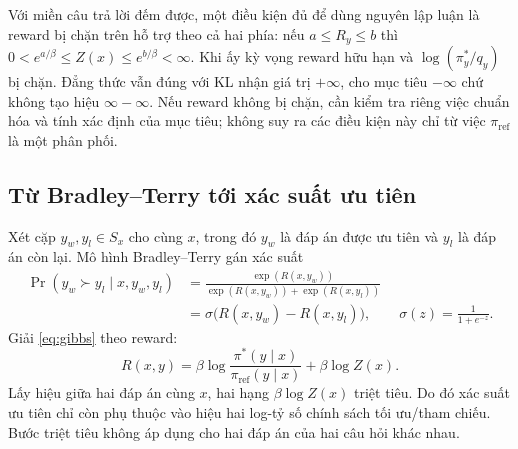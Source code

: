 \documentclass[11pt,a4paper]{article}
\newcommand{\pref}{\pi_{\mathrm{ref}}}
\begin{document}
Với miền câu trả lời đếm được, một điều kiện đủ để dùng nguyên lập luận là reward bị chặn trên hỗ trợ theo cả hai phía: nếu $a\le R_y\le b$ thì $0<e^{a/\beta}\le Z(x)\le e^{b/\beta}<\infty$. Khi ấy kỳ vọng reward hữu hạn và $\log(\pi_y^*/q_y)$ bị chặn. Đẳng thức vẫn đúng với KL nhận giá trị $+\infty$, cho mục tiêu $-\infty$ chứ không tạo hiệu $\infty-\infty$. Nếu reward không bị chặn, cần kiểm tra riêng việc chuẩn hóa và tính xác định của mục tiêu; không suy ra các điều kiện này chỉ từ việc $\pref$ là một phân phối.

\subsection*{Từ Bradley–Terry tới xác suất ưu tiên}
Xét cặp $y_w,y_l\in S_x$ cho cùng $x$, trong đó $y_w$ là đáp án được ưu tiên và $y_l$ là đáp án còn lại. Mô hình Bradley–Terry gán xác suất
\begin{align*}
  \Pr(y_w\succ y_l\mid x,y_w,y_l)
   &=\frac{\exp(R(x,y_w))}{\exp(R(x,y_w))+\exp(R(x,y_l))}\\
   &=\sigma\bigl(R(x,y_w)-R(x,y_l)\bigr),
   \qquad \sigma(z)=\frac{1}{1+e^{-z}}.
\end{align*}
Giải \eqref{eq:gibbs} theo reward:
\[
  R(x,y)=\beta\log\frac{\pi^*(y\mid x)}{\pref(y\mid x)}+\beta\log Z(x).
\]
Lấy hiệu giữa hai đáp án cùng $x$, hai hạng $\beta\log Z(x)$ triệt tiêu. Do đó xác suất ưu tiên chỉ còn phụ thuộc vào hiệu hai log-tỷ số chính sách tối ưu/tham chiếu. Bước triệt tiêu không áp dụng cho hai đáp án của hai câu hỏi khác nhau.
\end{document}
